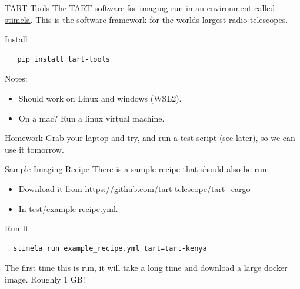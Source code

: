 \documentclass[ignorenonframetext]{beamer}
\begin{document}
\begin{frame}[fragile]{TART Tools}
  The TART software for imaging run in an environment called \href{https://github.com/caracal-pipeline/stimela}{stimela}. This is the software framework for the worlds largest radio telescopes.

  \begin{block}{Install}
  \begin{verbatim}
   pip install tart-tools
  \end{verbatim}
  \end{block}

  Notes:
  \begin{itemize}
   \item Should work on Linux and windows (WSL2).
   \item On a mac? Run a linux virtual machine.
  \end{itemize}
   \begin{block}{Homework}
   Grab your laptop and try, and run a test script (see later), so we can use it tomorrow.
   \end{block}

\end{frame}


\begin{frame}[fragile]{Sample Imaging Recipe}
There is a sample recipe that should also be run:
\begin{itemize}
 \item Download it from \url{https://github.com/tart-telescope/tart_cargo}
 \item In test/example-recipe.yml.
\end{itemize}
\begin{block}{Run It}
 \begin{verbatim}
  stimela run example_recipe.yml tart=tart-kenya
 \end{verbatim}
\end{block}
 The first time this is run, it will take a long time and download a large docker image. Roughly 1 GB!
\end{frame}
\end{document}
